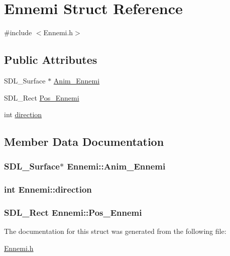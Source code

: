 \hypertarget{structEnnemi}{}\section{Ennemi Struct Reference}
\label{structEnnemi}


{\ttfamily \#include $<$Ennemi.\+h$>$}

\subsection*{Public Attributes}
\begin{DoxyCompactItemize}
\item 
S\+D\+L\+\_\+\+Surface $\ast$ \hyperlink{structEnnemi_a9f9ca5ef77c582955a8a1a91557a2c71}{Anim\+\_\+\+Ennemi}
\item 
S\+D\+L\+\_\+\+Rect \hyperlink{structEnnemi_a59466475e7528c44d63fbb4a7cbab2d6}{Pos\+\_\+\+Ennemi}
\item 
int \hyperlink{structEnnemi_a5fcc1b018d910c113d7f1cf2771fb900}{direction}
\end{DoxyCompactItemize}


\subsection{Member Data Documentation}
\subsubsection[{\texorpdfstring{Anim\+\_\+\+Ennemi}{Anim_Ennemi}}]{\setlength{\rightskip}{0pt plus 5cm}S\+D\+L\+\_\+\+Surface$\ast$ Ennemi\+::\+Anim\+\_\+\+Ennemi}\hypertarget{structEnnemi_a9f9ca5ef77c582955a8a1a91557a2c71}{}\label{structEnnemi_a9f9ca5ef77c582955a8a1a91557a2c71}
\subsubsection[{\texorpdfstring{direction}{direction}}]{\setlength{\rightskip}{0pt plus 5cm}int Ennemi\+::direction}\hypertarget{structEnnemi_a5fcc1b018d910c113d7f1cf2771fb900}{}\label{structEnnemi_a5fcc1b018d910c113d7f1cf2771fb900}
\subsubsection[{\texorpdfstring{Pos\+\_\+\+Ennemi}{Pos_Ennemi}}]{\setlength{\rightskip}{0pt plus 5cm}S\+D\+L\+\_\+\+Rect Ennemi\+::\+Pos\+\_\+\+Ennemi}\hypertarget{structEnnemi_a59466475e7528c44d63fbb4a7cbab2d6}{}\label{structEnnemi_a59466475e7528c44d63fbb4a7cbab2d6}


The documentation for this struct was generated from the following file\+:\begin{DoxyCompactItemize}
\item 
\hyperlink{Ennemi_8h}{Ennemi.\+h}\end{DoxyCompactItemize}
